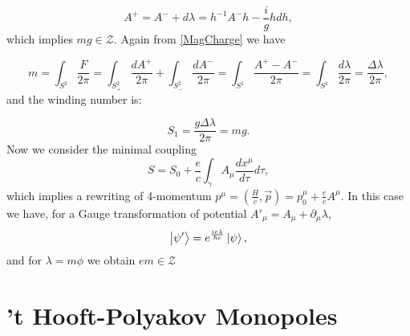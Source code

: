 \documentclass[main.tex]{subfiles}
\begin{document}
\begin{equation}
A^+=A^-+d\lambda=h^{-1}A^-h-\frac{i}{g}h dh,
\end{equation}
which implies $mg\in \mathcal{Z}$. Again from \eqref{MagCharge} we have

\begin{equation}
m=\int_{S^2}\frac{F}{2\pi}=\int_{S^2_+}\frac{dA^+}{2\pi}+\int_{S^2_-}\frac{dA^-}{2\pi}=\int_{S^1}\frac{A^+-A^-}{2\pi}=\int_{S^1}\frac{d\lambda}{2\pi}=\frac{\Delta\lambda}{2\pi},
\end{equation}
and the winding number is:

\begin{equation}
S_1=\frac{g\Delta\lambda}{2\pi}=mg.
\end{equation}
Now we consider the minimal coupling
\begin{equation}
S=S_0+\frac{e}{c}\int_{\gamma}A_{\mu}\frac{dx^{\mu}}{d\tau}d\tau,
\end{equation}
which implies a rewriting of 4-momentum $p^{\mu}=\left(\frac{H}{c},\vec p\right)=p_0^{\mu}+\frac{e}{c}A^{\mu}$.
In this case we have, for a Gauge transformation of potential $A'_{\mu}=A_{\mu}+\partial_{\mu}\lambda$,
\begin{equation}
\ket{\psi'}=e^{\frac{ie\lambda}{\hbar c}}\ket{\psi},
\end{equation}
and for $\lambda=m\phi$ we obtain $em\in \mathcal{Z}$
\section{’t Hooft-Polyakov Monopoles}
\end{document}
